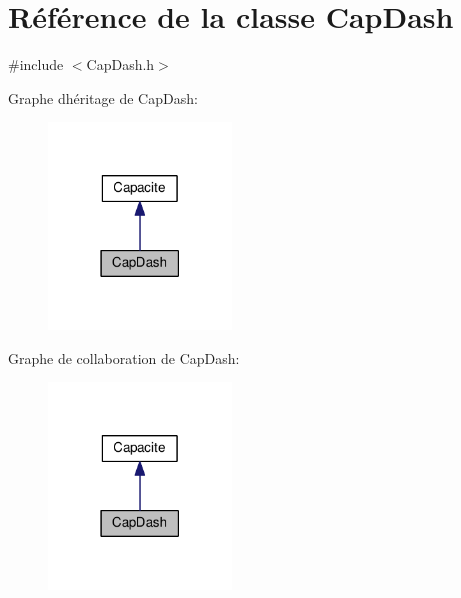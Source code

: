 \hypertarget{class_cap_dash}{}\section{Référence de la classe Cap\+Dash}
\label{class_cap_dash}


{\ttfamily \#include $<$Cap\+Dash.\+h$>$}



Graphe d\textquotesingle{}héritage de Cap\+Dash\+:\nopagebreak
\begin{figure}[H]
\begin{center}
\leavevmode
\includegraphics[width=138pt]{class_cap_dash__inherit__graph}
\end{center}
\end{figure}


Graphe de collaboration de Cap\+Dash\+:\nopagebreak
\begin{figure}[H]
\begin{center}
\leavevmode
\includegraphics[width=138pt]{class_cap_dash__coll__graph}
\end{center}
\end{figure}
